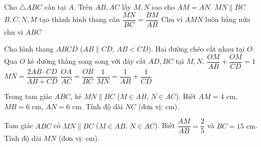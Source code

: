 \begin{ex}%
	Cho $\triangle ABC$ cân tại $A$. Trên $AB, AC$ lấy $M, N$ sao cho $AM = AN$.
	\choiceTF
	{\True $MN \parallel BC$}
	{\True $B, C, N, M$ tạo thành hình thang cân}
	{$\dfrac{MN}{BC} = \dfrac{BM}{AB}$}
	{Chu vi $AMN$ luôn bằng nửa chu vi $ABC$}
\end{ex}

\begin{ex}%
	Cho hình thang $ABCD$ ($AB \parallel CD$, $AB < CD$). Hai đường chéo cắt nhau tại $O$. Qua $O$ kẻ đường thẳng song song với đáy cắt $AD, BC$ tại $M, N$.
	\choiceTF
	{\True $\dfrac{OM}{AB} + \dfrac{OM}{CD} = 1$}
	{\True $MN = \dfrac{2AB \cdot CD}{AB + CD}$}
	{$\dfrac{OA}{AC} = \dfrac{OB}{BC}$}
	{$\dfrac{1}{MN} = \dfrac{1}{AB} + \dfrac{1}{CD}$}
\end{ex}

\begin{bt}%
	Trong tam giác $ABC$, kẻ $MN \parallel BC$ ($M \in AB$, $N \in AC$). Biết $AM=4\text{ cm}$, $MB=6\text{ cm}$, $AN=6\text{ cm}$. Tính độ dài $NC$ (đơn vị: cm).
\end{bt}

\begin{bt}%
	Tam giác $ABC$ có $MN \parallel BC$ ($M \in AB$, $N \in AC$). Biết $\dfrac{AM}{AB} = \dfrac{2}{5}$ và $BC = 15\text{ cm}$. Tính độ dài $MN$ (đơn vị: cm).
\end{bt}

